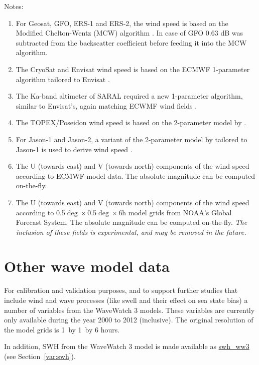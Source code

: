 \documentclass[a4paper,11pt,openany,natbib]{thesis}
\makeatletter
\newcommand\var[1]{\url{#1}\index{variables!#1@\protect\url{#1}}}
\makeatother
\begin{document}
Notes:
\begin{enumerate}
\item For Geosat, GFO, ERS-1 and ERS-2, the wind speed is based on the Modified Chelton-Wentz (MCW) algorithm \citep{witter1991}. In case of GFO 0.63 dB was subtracted from the backscatter coefficient before feeding it into the MCW algorithm.\label{item:wind_speed_mcw}
\item The CryoSat and Envisat wind speed is based on the ECMWF 1-parameter algorithm tailored to Envisat \citep{abdalla2007}.\label{item:wind_speed_abdalla}
\item The Ka-band altimeter of SARAL required a new 1-parameter algorithm, similar to Envisat's, again matching ECWMF wind fields \citep{lillibridge2014}.\label{item:wind_speed_saral}
\item The TOPEX/Poseidon wind speed is based on the 2-parameter model by \citet{gourrion2002b}.\label{item:wind_speed_topex}
\item For Jason-1 and Jason-2, a variant of the 2-parameter model by \citet{gourrion2002b} tailored to Jason-1 is used to derive wind speed \citep{collard2005}.\label{item:wind_speed_jason}
\item The U (towards east) and V (towards north) components of the wind speed according to ECMWF model data. The absolute magnitude can be computed on-the-fly.\label{item:wind_speed_ecmwf}
\item The U (towards east) and V (towards north) components of the wind speed according to 0.5$\deg\times$0.5$\deg\times$6h model grids from NOAA's Global Forecast System. The absolute magnitude can be computed on-the-fly. \emph{The inclusion of these fields is experimental, and may be removed in the future.}\label{item:wind_speed_gfs}
\end{enumerate}

\section{Other wave model data}
\label{var:wave}
For calibration and validation purposes, and to support further studies that include wind and wave processes (like swell and their effect on sea state bias) a number of variables from the WaveWatch 3 models. These variables are currently only available during the year 2000 to 2012 (inclusive). The original resolution of the model grids is 1\deg\ by 1\deg\ by 6 hours.

In addition, SWH from the WaveWatch 3 model is made available as \var{swh_ww3} (see Section~\ref{var:swh}).
\end{document}
